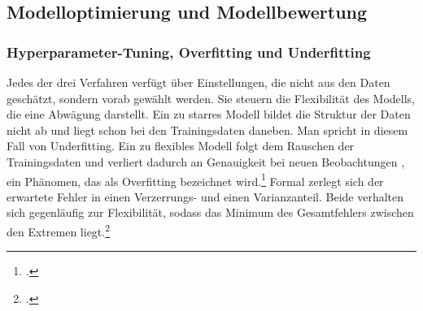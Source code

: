 \documentclass[12pt,a4paper]{article}
\begin{document}
\subsection{Modelloptimierung und Modellbewertung}
\label{sec:modellbewertung}

\subsubsection{Hyperparameter-Tuning, Overfitting und Underfitting}



Jedes der drei Verfahren verfügt über Einstellungen, die nicht aus den Daten geschätzt, sondern vorab gewählt werden. Sie steuern die Flexibilität des Modells, die eine Abwägung darstellt.
Ein zu starres Modell bildet die Struktur der Daten nicht ab und liegt schon bei den Trainingsdaten daneben. Man spricht in diesem Fall von Underfitting. Ein zu flexibles Modell folgt dem Rauschen der Trainingsdaten und verliert dadurch an Genauigkeit bei neuen Beobachtungen , ein Phänomen, das als Overfitting bezeichnet wird.\footcite[124]{Murphy2022} Formal zerlegt sich
der erwartete Fehler in einen Verzerrungs- und einen Varianzanteil. Beide verhalten sich gegenläufig
zur Flexibilität, sodass das Minimum des Gesamtfehlers zwischen den Extremen
liegt.\footcite[38, 223]{Hastie2009}
\end{document}
